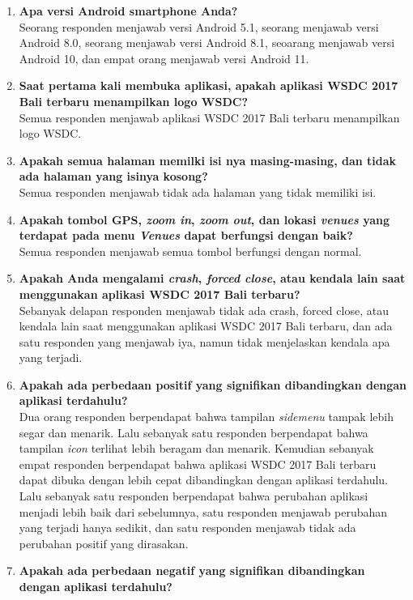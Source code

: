 \begin{enumerate}
	\item \textbf{Apa versi Android smartphone Anda?} \\
	Seorang responden menjawab versi Android 5.1, seorang menjawab versi Android 8.0, seorang menjawab versi Android 8.1, seoarang menjawab versi Android 10, dan empat orang menjawab versi Android 11.
	\item \textbf{Saat pertama kali membuka aplikasi, apakah aplikasi WSDC 2017 Bali terbaru menampilkan logo WSDC?} \\
	Semua responden menjawab aplikasi WSDC 2017 Bali terbaru menampilkan logo WSDC.
	\item \textbf{Apakah semua halaman memilki isi nya masing-masing, dan tidak ada halaman yang isinya kosong?} \\
	Semua responden menjawab tidak ada halaman yang tidak memiliki isi.
	\item \textbf{Apakah tombol GPS, \textit{zoom in}, \textit{zoom out}, dan lokasi \textit{venues} yang terdapat pada menu \textit{Venues} dapat berfungsi dengan baik?} \\
	Semua responden menjawab semua tombol berfungsi dengan normal.
	\newpage
	\item \textbf{Apakah Anda mengalami \textit{crash}, \textit{forced close}, atau kendala lain saat menggunakan aplikasi WSDC 2017 Bali terbaru?} \\
	Sebanyak delapan responden menjawab tidak ada crash, forced close, atau kendala lain saat menggunakan aplikasi WSDC 2017 Bali terbaru, dan ada satu responden yang menjawab iya, namun tidak menjelaskan kendala apa yang terjadi.
	\item \textbf{Apakah ada perbedaan positif yang signifikan dibandingkan dengan aplikasi terdahulu?} \\
	Dua orang responden berpendapat bahwa tampilan \textit{sidemenu} tampak lebih segar dan menarik. Lalu sebanyak satu responden berpendapat bahwa tampilan \textit{icon} terlihat lebih beragam dan menarik. Kemudian sebanyak empat responden berpendapat bahwa aplikasi WSDC 2017 Bali terbaru dapat dibuka dengan lebih cepat dibandingkan dengan aplikasi terdahulu. Lalu sebanyak satu responden berpendapat bahwa perubahan aplikasi menjadi lebih baik dari sebelumnya, satu responden menjawab perubahan yang terjadi hanya sedikit, dan satu responden menjawab tidak ada perubahan positif yang dirasakan.
	\item \textbf{Apakah ada perbedaan negatif yang signifikan dibandingkan dengan aplikasi terdahulu?} \\

\end{enumerate}
